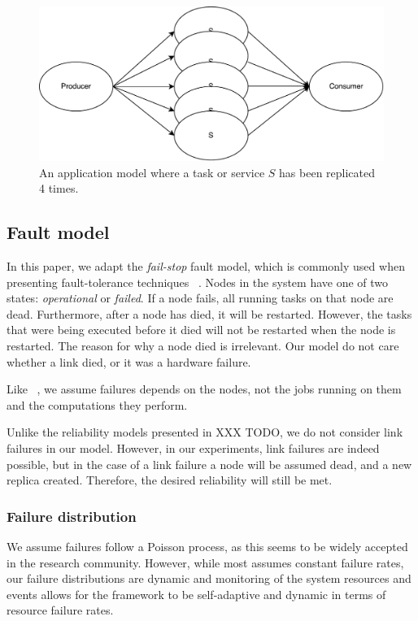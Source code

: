 \documentclass{cslthse-msc}
\begin{document}
\begin{figure}[!hbt]
\centering
\includegraphics[scale=0.5]{images/app_model_replication.pdf} 
\caption{An application model where a task or service $S$ has been replicated 4 times.}\label{fig:app_model_replication}
\end{figure}

\subsection{Fault model} \label{subsec:design_fault_model}
In this paper, we adapt the \emph{fail-stop} fault model, which is commonly used when presenting fault-tolerance techniques ~\cite{surveyFaultParallel}. Nodes in the system have one of two states: \emph{operational} or \emph{failed}. If a node fails, all running tasks on that node are dead. Furthermore, after a node has died, it will be restarted. However, the tasks that were being executed before it died will not be restarted when the node is restarted. The reason for why a node died is irrelevant. Our model do not care whether a link died, or it was a hardware failure. 

Like ~\cite{selfAdaptRel}, we assume failures depends on the nodes, not the jobs running on them and the computations they perform.

Unlike the reliability models presented in XXX TODO, we do not consider link failures in our model. However, in our experiments, link failures are indeed possible, but in the case of a link failure a node will be assumed dead, and a new replica created. Therefore, the desired reliability will still be met. %


\subsubsection{Failure distribution}
We assume failures follow a Poisson process, as this seems to be widely accepted in the research community. However, while most assumes constant failure rates, our failure distributions are dynamic and monitoring of the system resources and events allows for the framework to be self-adaptive and dynamic in terms of resource failure rates.
\end{document}
